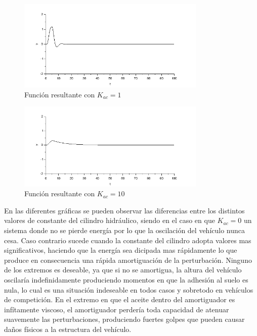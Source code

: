 \documentclass[12pt]{article}
\begin{document}
\begin{figure}[p]
\center
\includegraphics[width=0.8\textwidth]{amortiguador_1.PNG}
\caption{Función resultante con $K_{ac}=1$}
\label{KAC1}
\end{figure}

\begin{figure}[p]
\center
\includegraphics[width=0.8\textwidth]{amortiguador_10.PNG}
\caption{Función resultante con $K_{ac}=10$}
\label{KAC10}
\end{figure}

En las diferentes gráficas se pueden observar las diferencias entre los distintos valores de constante del cilindro hidráulico, siendo en el caso en que $K_{ac} = 0$ un sistema donde no se pierde energía por lo que la oscilación del vehículo nunca cesa. Caso contrario sucede cuando la constante del cilindro adopta valores mas significativos, haciendo que la energía sea dicipada mas rápidamente lo que produce en consecuencia una rápida amortiguación de la perturbación. Ninguno de los extremos es deseable, ya que si no se amortigua, la altura del vehículo oscilaría indefinidamente produciendo momentos en que la adhesión al suelo es nula, lo cual es una situación indeseable en todos casos y sobretodo en vehículos de competición. En el extremo en que el aceite dentro del amortiguador es infítamente viscoso, el amortiguador perdería toda capacidad de atenuar suavemente las perturbaciones, produciendo fuertes golpes que pueden causar daños físicos a la estructura del vehículo.\\
\end{document}
